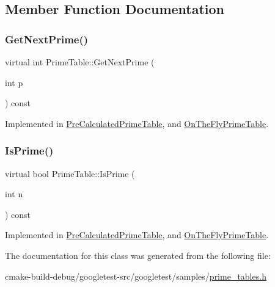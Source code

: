 \subsection{Member Function Documentation}
\mbox{\label{classPrimeTable_ae537c939f56617d8937d57bbbae3ab30}} 
\subsubsection{\texorpdfstring{GetNextPrime()}{GetNextPrime()}}
{\footnotesize\ttfamily virtual int Prime\+Table\+::\+Get\+Next\+Prime (\begin{DoxyParamCaption}\item[{int}]{p }\end{DoxyParamCaption}) const\hspace{0.3cm}{\ttfamily [pure virtual]}}



Implemented in \mbox{\hyperlink{classPreCalculatedPrimeTable_a0ff10b1fe13df7e56b8d7ed9f41d3998}{Pre\+Calculated\+Prime\+Table}}, and \mbox{\hyperlink{classOnTheFlyPrimeTable_a5a4644fedd95d33136723f33b9302bfc}{On\+The\+Fly\+Prime\+Table}}.

\mbox{\label{classPrimeTable_a2ab9243364ded0c51541f641b2df362a}} 
\subsubsection{\texorpdfstring{IsPrime()}{IsPrime()}}
{\footnotesize\ttfamily virtual bool Prime\+Table\+::\+Is\+Prime (\begin{DoxyParamCaption}\item[{int}]{n }\end{DoxyParamCaption}) const\hspace{0.3cm}{\ttfamily [pure virtual]}}



Implemented in \mbox{\hyperlink{classPreCalculatedPrimeTable_a8a9ab7f99b09e5e987933c260e7304cf}{Pre\+Calculated\+Prime\+Table}}, and \mbox{\hyperlink{classOnTheFlyPrimeTable_a1d49b78f79e018441289e79d75680067}{On\+The\+Fly\+Prime\+Table}}.



The documentation for this class was generated from the following file\+:\begin{DoxyCompactItemize}
\item 
cmake-\/build-\/debug/googletest-\/src/googletest/samples/\mbox{\hyperlink{prime__tables_8h}{prime\+\_\+tables.\+h}}\end{DoxyCompactItemize}
